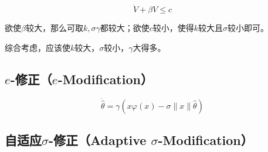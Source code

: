\[\dot{V} + \beta V \leq c\]

欲使\(\beta\)较大，那么可取\(k,\sigma\gamma\)都较大；欲使\(c\)较小，使得\(k\)较大且\(\sigma\)较小即可。

综合考虑，应该使\(k\)较大，\(\sigma\)较小，\(\gamma\)大得多。


\subsection{\texorpdfstring{$e$-修正（$e$-Modification）}{e-修正（e-Modification）}}

\[\dot{\hat{\theta}} = \gamma(x\varphi(x) - \sigma \parallel x \parallel \hat{\theta})\]

\subsection{\texorpdfstring{自适应$\sigma$-修正（Adaptive $\sigma$-Modification）}{自适应σ-修正（Adaptive σ-Modification）}}